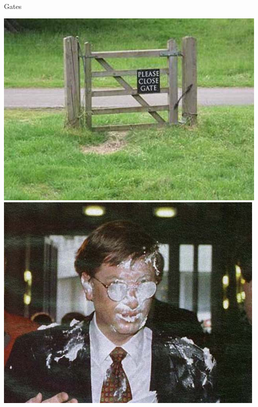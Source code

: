 \documentclass[xcolor=pdftex,x11names,table,hyperref]{beamer}
\begin{document}
\begin{frame}{Gates}
\begin{center}
\includegraphics[height=0.30\textheight]{images/gate_funny.jpg}
\hspace{1.7em}
\includegraphics[height=0.30\textheight]{images/bill-gates-pie.jpg}
\end{center}


\end{frame}
\end{document}
